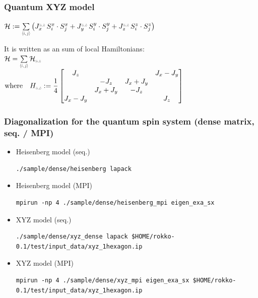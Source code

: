 \begin{frame}[c,fragile]
  \frametitle{Quantum XYZ model}
\setlength{\fboxsep}{1pt}

\noindent
$\mathcal{H}
 := \sum\limits_{\middlescr{{\langle i,j \rangle}}} \left(
  J_x^{\smallscr{\langle i,j \rangle}} \, S^x_i \cdot S^x_j
+ J_y^{\smallscr{\langle i,j \rangle}} \, S^y_i \cdot S^y_j
+ J_z^{\smallscr{\langle i,j \rangle}} \, S^z_i \cdot S^z_j
\right)$

\vspace{1\baselineskip}

\noindent
It is written as an sum of local Hamiltonians:\\
\noindent
$\mathcal{H} =
\sum\limits_{\middlescr{\langle i,j \rangle}}  \mathcal{H}_{\smallscr{\langle i,j \rangle}}$ \\
$\text{where} \quad  H_{\smallscr{\langle i,j \rangle}} :=
\dfrac{1}{4}
\begin{bmatrix}
J_z & & & J_x-J_y \\
 & - J_z & J_x+J_y & \\
 & J_x+J_y & - J_z & \\
J_x-J_y & & & J_z
\end{bmatrix}$

\end{frame}

\begin{frame}[c,fragile]
  \frametitle{Diagonalization for the quantum spin system (dense matrix, seq. / MPI)}
  \begin{itemize}
  \item Heisenberg model (seq.) 
\begin{lstlisting}[style=shstyle]
./sample/dense/heisenberg lapack
\end{lstlisting}
  \item Heisenberg model (MPI) 
\begin{lstlisting}[style=shstyle]
mpirun -np 4 ./sample/dense/heisenberg_mpi eigen_exa_sx
\end{lstlisting}
  \item XYZ model (seq.) 
\begin{lstlisting}[style=shstyle]
./sample/dense/xyz_dense lapack $HOME/rokko-0.1/test/input_data/xyz_1hexagon.ip
\end{lstlisting}
  \item XYZ model (MPI) 
\begin{lstlisting}[style=shstyle]
mpirun -np 4 ./sample/dense/xyz_mpi eigen_exa_sx $HOME/rokko-0.1/test/input_data/xyz_1hexagon.ip
\end{lstlisting}
  \end{itemize}
\end{frame}

